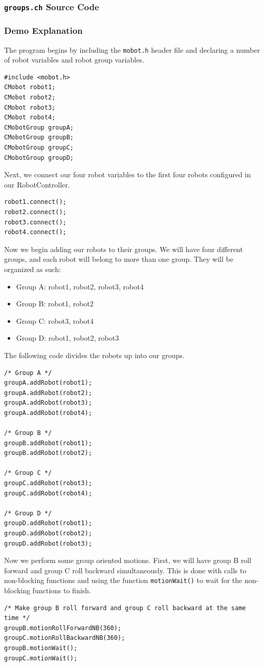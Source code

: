 \documentclass{article}
\begin{document}
\subsubsection{\texttt{groups.ch} Source Code}

\subsubsection{Demo Explanation}
The program begins by including the \texttt{mobot.h} header file
and declaring a number of robot variables and robot group variables.
\begin{verbatim}
#include <mobot.h>
CMobot robot1;
CMobot robot2;
CMobot robot3;
CMobot robot4;
CMobotGroup groupA;
CMobotGroup groupB;
CMobotGroup groupC;
CMobotGroup groupD;
\end{verbatim}

Next, we connect our four robot variables to the first four robots 
configured in our RobotController.
\begin{verbatim}
robot1.connect();
robot2.connect();
robot3.connect();
robot4.connect();
\end{verbatim}

Now we begin adding our robots to their groups. We will have four different groups, and each robot
will belong to more than one group. They will be organized as such:
\begin{itemize}
\item Group A: robot1, robot2, robot3, robot4
\item Group B: robot1, robot2
\item Group C: robot3, robot4
\item Group D: robot1, robot2, robot3
\end{itemize}
The following code divides the robots up into our groups.
\begin{verbatim}
/* Group A */
groupA.addRobot(robot1);
groupA.addRobot(robot2);
groupA.addRobot(robot3);
groupA.addRobot(robot4);

/* Group B */
groupB.addRobot(robot1);
groupB.addRobot(robot2);

/* Group C */
groupC.addRobot(robot3);
groupC.addRobot(robot4);

/* Group D */
groupD.addRobot(robot1);
groupD.addRobot(robot2);
groupD.addRobot(robot3);
\end{verbatim}

Now we perform some group oriented motions. First, we will have group B roll forward and group C
roll backward simultaneously. This is done with calls to non-blocking functions and using the
function \texttt{motionWait()} to wait for the non-blocking functions to finish.
\begin{verbatim}
/* Make group B roll forward and group C roll backward at the same time */
groupB.motionRollForwardNB(360);
groupC.motionRollBackwardNB(360);
groupB.motionWait();
groupC.motionWait();
\end{verbatim}
\end{document}
